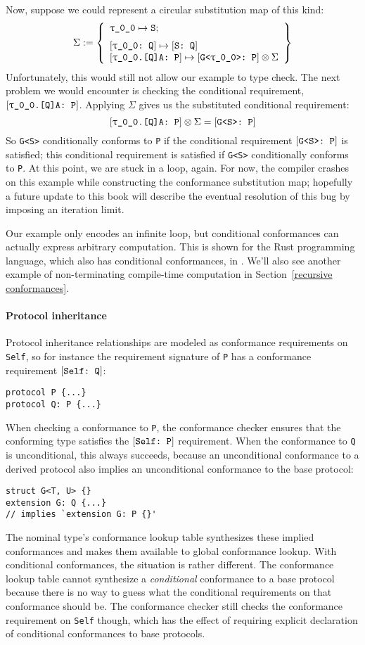 \documentclass[../generics]{subfiles}
\begin{document}
\begin{example}
Now, suppose we could represent a circular substitution map of this kind:
\[\Sigma := \SubstMapLongC{\SubstType{\ttgp{0}{0}}{S}}{
\SubstConf{\ttgp{0}{0}}{S}{Q}\\
\ConfReq{\ttgp{0}{0}.[Q]A}{P}\mapsto\ConfReq{G<\ttgp{0}{0}>}{P}\otimes\Sigma
}\]
Unfortunately, this would still not allow our example to type check. The next problem we would encounter is checking the conditional requirement, $[\texttt{\texttt{$\uptau$\_0\_0}.[Q]A:~P}]$. Applying $\Sigma$ gives us the substituted conditional requirement:
\[[\texttt{\texttt{$\uptau$\_0\_0}.[Q]A:~P}]\otimes\Sigma=[\texttt{G<S>:~P}]\]
So \texttt{G<S>} conditionally conforms to \texttt{P} if the conditional requirement $[\texttt{G<S>:~P}]$ is satisfied; this conditional requirement is satisfied if \texttt{G<S>} conditionally conforms to \texttt{P}. At this point, we are stuck in a loop, again. For now, the compiler crashes on this example while constructing the conformance substitution map; hopefully a future update to this book will describe the eventual resolution of this bug by imposing an iteration limit.

Our example only encodes an infinite loop, but conditional conformances can actually express arbitrary computation. This is shown for the Rust programming language, which also has conditional conformances, in \cite{rustturing}. We'll also see another example of non-terminating compile-time computation in Section~\ref{recursive conformances}.
\end{example}

\paragraph{Protocol inheritance}
Protocol inheritance relationships are modeled as conformance requirements on \texttt{Self}, so for instance the requirement signature of \verb|P| has a conformance requirement $[\texttt{Self:~Q}]$:
\begin{Verbatim}
protocol P {...}
protocol Q: P {...}
\end{Verbatim}
When checking a conformance to \texttt{P}, the conformance checker ensures that the conforming type satisfies the $[\texttt{Self:~P}]$ requirement. When the conformance to \texttt{Q} is unconditional, this always succeeds, because an unconditional conformance to a derived protocol also implies an unconditional conformance to the base protocol:
\begin{Verbatim}
struct G<T, U> {}
extension G: Q {...}
// implies `extension G: P {}'
\end{Verbatim}
The nominal type's conformance lookup table synthesizes these implied conformances and makes them available to global conformance lookup. With conditional conformances, the situation is rather different. The conformance lookup table cannot synthesize a \emph{conditional} conformance to a base protocol because there is no way to guess what the conditional requirements on that conformance should be. The conformance checker still checks the conformance requirement on \texttt{Self} though, which has the effect of requiring explicit declaration of conditional conformances to base protocols.
\end{document}
